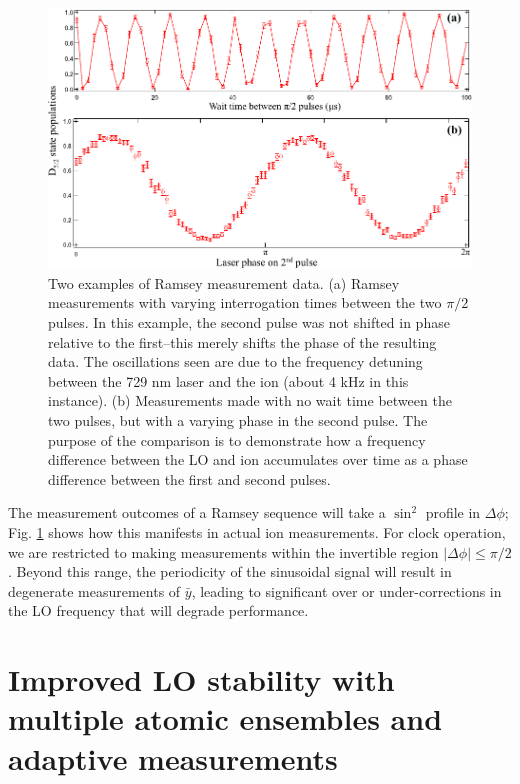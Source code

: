 \begin{figure}[t]
    \begin{center}
        \includegraphics{figures/5/Fig_RamseyEx}
        \caption{\label{fig:RamseyEx} Two examples of Ramsey measurement data. (a) Ramsey measurements with varying interrogation times between the two $\pi / 2$ pulses. In this example, the second pulse was not shifted in phase relative to the first--this merely shifts the phase of the resulting data. The oscillations seen are due to the frequency detuning between the 729 nm laser and the ion (about 4 kHz in this instance). (b) Measurements made with no wait time between the two pulses, but with a varying phase in the second pulse. The purpose of the comparison is to demonstrate how a frequency difference between the LO and ion accumulates over time as a phase difference between the first and second pulses.
           }
    \end{center}
\end{figure}

The measurement outcomes of a Ramsey sequence will take a $\sin^2$ profile in $\Delta \phi$; Fig. \ref{fig:RamseyEx} shows how this manifests in actual ion measurements. For clock operation, we are restricted to making measurements within the invertible region $|\Delta \phi| \leq \pi/2$. Beyond this range, the periodicity of the sinusoidal signal will result in degenerate measurements of $\bar{y}$, leading to significant over or under-corrections in the LO frequency that will degrade performance.







\section{Improved LO stability with multiple atomic ensembles and adaptive measurements} 


